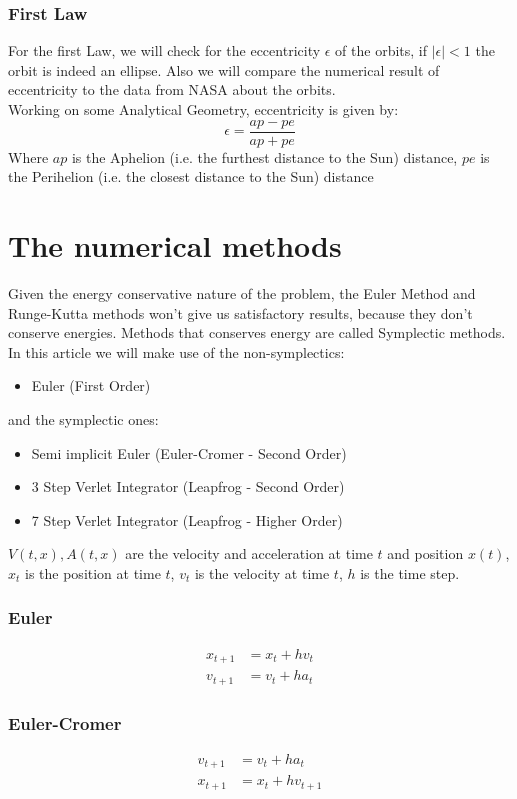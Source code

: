 \documentclass[12pt]{article}
\begin{document}
\subsubsection{First Law}
For the first Law, we will check for the eccentricity \(\epsilon \) of the orbits, if \(\lvert \epsilon \rvert < 1\) the orbit is indeed an ellipse. Also we will compare the numerical result of eccentricity to the data from NASA about the orbits.\\
Working on some Analytical Geometry, eccentricity is given by:
\[
\epsilon = \frac{ap - pe}{ap + pe}
\]
Where \(ap\) is the Aphelion (i.e. the furthest distance to the Sun) distance, \(pe\) is the Perihelion (i.e. the closest distance to the Sun) distance

\section{The numerical methods}
Given the energy conservative nature of the problem, the Euler Method and Runge-Kutta methods won't give us satisfactory results, because they don't conserve energies. Methods that conserves energy are called Symplectic methods.
In this article we will make use of the non-symplectics:
\begin{itemize}
  \item Euler (First Order)
\end{itemize}
 and the symplectic ones:
 \begin{itemize}
   \item Semi implicit Euler (Euler-Cromer - Second Order)
   \item 3 Step Verlet Integrator (Leapfrog - Second Order)
   \item 7 Step Verlet Integrator (Leapfrog - Higher Order)
 \end{itemize}
  \(V(t, x), A(t, x)\) are the velocity and acceleration at time \(t\) and position \(x(t)\), \(x_t\) is the position at time \(t\), \(v_t\) is the velocity at time \(t \), \(h\) is the time step.
 \subsubsection{Euler}
 \begin{align*}
   x_{t+1} &= x_t + h v_t\\
   v_{t+1} &= v_t + h a_t
 \end{align*}
 \subsubsection{Euler-Cromer}
 \begin{align*}
  v_{t+1} &= v_t + h a_t \\
  x_{t+1} &= x_t + h v_{t+1}
 \end{align*}
\end{document}
